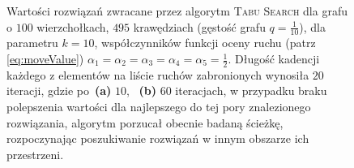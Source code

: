 \begin{figure}[!htbp]
\begin{subfigure}[b]{0.45\textwidth}
		\caption{}
		\label{fig:rrimst1:b}
	\end{subfigure}
	\hfill\null
	\caption{
		Wartości rozwiązań zwracane przez algorytm \textsc{Tabu Search} dla grafu o $100$ wierzchołkach, $495$ krawędziach (gęstość grafu $q = \frac{1}{10}$), dla parametru $k = 10$, współczynników funkcji oceny ruchu (patrz \ref{eq:moveValue}) $\alpha_{1} = \alpha_{2} = \alpha_{3} = \alpha_{4} = \alpha_{5} = \frac{1}{2}$. Długość kadencji każdego z elementów na liście ruchów zabronionych wynosiła $20$ iteracji, gdzie po~\textbf{(a)} $10$, ~\textbf{(b)} $60$ iteracjach, w przypadku braku polepszenia wartości dla najlepszego do tej pory znalezionego rozwiązania, algorytm porzucał obecnie badaną ścieżkę, rozpoczynając poszukiwanie rozwiązań w innym obszarze ich przestrzeni.
	}
\end{figure}

